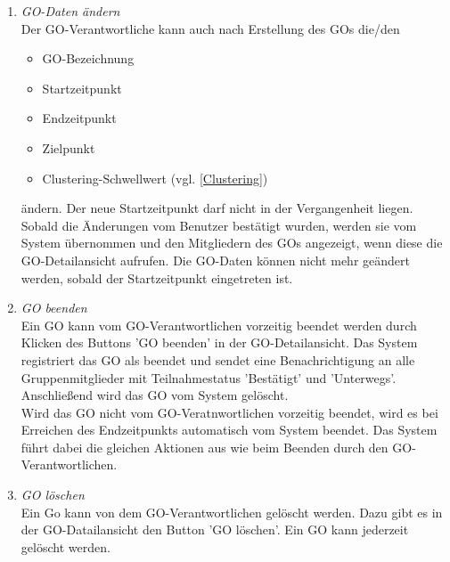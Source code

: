 \documentclass[parskip=full]{scrartcl}
\def\threedigits#1{%
  \ifnum#1<100 0\fi
  \ifnum#1<10 0\fi
  \number#1}
\begin{document}
\begin{enumerate}[label={\textbf{/F\protect\threedigits{\theenumi}0/}}, leftmargin=*, resume]	
	\item \textit{GO-Daten ändern} \\
	Der GO-Verantwortliche kann auch nach Erstellung des GOs die/den
	\begin{itemize}
		\item GO-Bezeichnung
		\item Startzeitpunkt
		\item Endzeitpunkt
		\item Zielpunkt
		\item \colorbox{shadecolor}{Clustering-Schwellwert (vgl. \ref{Clustering})}
	\end{itemize}
	ändern. Der neue Startzeitpunkt darf nicht in der Vergangenheit liegen. Sobald die Änderungen vom Benutzer bestätigt wurden, werden sie vom System übernommen und den Mitgliedern des GOs angezeigt, wenn diese die GO-Detailansicht aufrufen. Die GO-Daten können nicht mehr geändert werden, sobald der Startzeitpunkt eingetreten ist.
	
	\item \textit{GO beenden} \\
	Ein GO kann vom GO-Verantwortlichen vorzeitig beendet werden durch Klicken des Buttons 'GO beenden' in der GO-Detailansicht. Das System registriert das GO als beendet und sendet eine Benachrichtigung an alle Gruppenmitglieder mit Teilnahmestatus 'Bestätigt' und 'Unterwegs'. Anschließend wird das GO vom System gelöscht. \\
	Wird das GO nicht vom GO-Veratnwortlichen vorzeitig beendet, wird es bei Erreichen des Endzeitpunkts automatisch vom System beendet. Das System führt dabei die gleichen Aktionen aus wie beim Beenden durch den GO-Verantwortlichen.
	
	\item \textit{GO löschen} \\
	Ein Go kann von dem GO-Verantwortlichen gelöscht werden. Dazu gibt es in der GO-Datailansicht den Button 'GO löschen'. Ein GO kann jederzeit gelöscht werden.
\end{enumerate}
\end{document}
